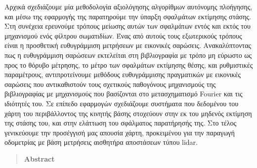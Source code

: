 Αρχικά σχεδιάζουμε μία μεθοδολογία αξιολόγησης αλγορίθμων αυτόνομης πλοήγησης,
και μέσω της εφαρμογής της παρατηρούμε την ύπαρξη σφαλμάτων εκτίμησης στάσης.
Στη συνέχεια ερευνούμε τρόπους μείωσης αυτών των σφαλμάτων εντός και εκτός του
μηχανισμού ενός φίλτρου σωματιδίων. Ένας από αυτούς τους εξωτερικούς τρόπους
είναι η προσθετική ευθυγράμμιση μετρήσεων με εικονικές σαρώσεις.
Ανακαλύπτοντας πως η ευθυγράμμιση σαρώσεων εκτελείται στη βιβλιογραφία με τρόπο
μη εύρωστο ως προς το θόρυβο μέτρησης, το μέτρο των σφαλμάτων εκτίμησης θέσης,
και ρυθμιστικές παραμέτρους, αντιπροτείνουμε μεθόδους ευθυγράμμισης πραγματικών
με εικονικές σαρώσεις που αντικαθιστούν τους σχετικούς παθογόνους μηχανισμούς
της βιβλιογραφίας με μηχανισμούς που βασίζονται στο μετασχηματισμό Fourier και
τις ιδιότητές του. Σε επίπεδο εφαρμογών σχεδιάζουμε συστήματα που δεδομένου
του χάρτη του περιβάλλοντος της κινητής βάσης στοχεύουν στην εκ του μηδενός
εκτίμηση της στάσης του, και στην ελάττωση του σφάλματος παρατήρησής της. Στο
τέλος γενικεύουμε την προσέγγισή μας απουσία χάρτη, προκειμένου για την
παραγωγή οδομετρίας με βάση μετρήσεις αισθητήρα αποστάσεων τύπου lidar.


\newpage

\begin{quotation}
\begin{center}
\textbf{Abstract}
\end{center}
\noindent
\end{quotation}

\restoregeometry
\doublespace
